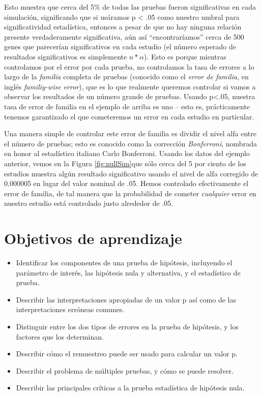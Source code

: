 \documentclass[
  12pt,
]{book}
\providecommand{\tightlist}{%
  \setlength{\itemsep}{0pt}\setlength{\parskip}{0pt}}
\begin{document}
Esto muestra que cerca del 5\% de todas las pruebas fueron significativas en cada simulación, significando que si usáramos p \textless{} .05 como nuestro umbral para significatividad estadística, entonces a pesar de que no hay ninguna relación presente verdaderamente significativa, aún así ``encontraríamos'' cerca de 500 genes que parecerían significativos en cada estudio (el número esperado de resultados significativos es simplemente \(n * \alpha\)). Esto es porque mientras controlamos por el error por cada prueba, no controlamos la tasa de errores a lo largo de la \emph{familia} completa de pruebas (conocido como el \emph{error de familia}, en inglés \emph{familiy-wise error}), que es lo que realmente queremos controlar si vamos a observar los resultados de un número grande de pruebas. Usando p\textless.05, nuestra tasa de error de familia en el ejemplo de arriba es uno -- esto es, prácticamente tenemos garantizado el que cometeremos un error en cada estudio en particular.

Una manera simple de controlar este error de familia es dividir el nivel alfa entre el número de pruebas; esto es conocido como la corrección \emph{Bonferroni}, nombrada en honor al estadístico italiano Carlo Bonferroni. Usando los datos del ejemplo anterior, vemos en la Figura \ref{fig:nullSim}que sólo cerca del 5 por ciento de los estudios muestra algún resultado significativo usando el nivel de alfa corregido de 0.000005 en lugar del valor nominal de .05. Hemos controlado efectivamente el error de familia, de tal manera que la probabilidad de cometer \emph{cualquier} error en nuestro estudio está controlado justo alrededor de .05.

\hypertarget{objetivos-de-aprendizaje-8}{%
\section{Objetivos de aprendizaje}\label{objetivos-de-aprendizaje-8}}

\begin{itemize}
\tightlist
\item
  Identificar los componentes de una prueba de hipótesis, incluyendo el parámetro de interés, las hipótesis nula y alternativa, y el estadístico de prueba.
\item
  Describir las interpretaciones apropiadas de un valor p así como de las interpretaciones erróneas comunes.
\item
  Distinguir entre los dos tipos de errores en la prueba de hipótesis, y los factores que los determinan.
\item
  Describir cómo el remuestreo puede ser usado para calcular un valor p.
\item
  Describir el problema de múltiples pruebas, y cómo se puede resolver.
\item
  Describir las principales críticas a la prueba estadística de hipótesis nula.
\end{itemize}
\end{document}
